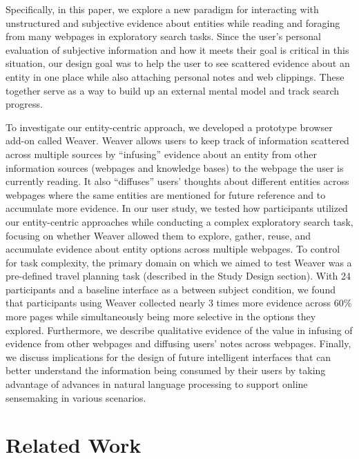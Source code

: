 Specifically, in this paper, we explore a new paradigm for interacting with unstructured and subjective evidence about entities while reading and foraging from many webpages in exploratory search tasks. Since the user's personal evaluation of subjective information and how it meets their goal is critical in this situation, our design goal was to help the user to see scattered evidence about an entity in one place while also attaching personal notes and web clippings. These together serve as a way to build up an external mental model and track search progress.

To investigate our entity-centric approach, we developed a prototype browser add-on called Weaver. Weaver allows users to keep track of information scattered across multiple sources by ``infusing'' evidence about an entity from other information sources (webpages and knowledge bases) to the webpage the user is currently reading. It also ``diffuses'' users' thoughts about different entities across webpages where the same entities are mentioned for future reference and to accumulate more evidence. In our user study, we tested how participants utilized our entity-centric approaches while conducting a complex exploratory search task, focusing on whether Weaver allowed them to explore, gather, reuse, and accumulate evidence about entity options across multiple webpages. To control for task complexity, the primary domain on which we aimed to test Weaver was a pre-defined travel planning task (described in the Study Design section). With 24 participants and a baseline interface as a between subject condition, we found that participants using Weaver collected nearly 3 times more evidence across 60\% more pages while simultaneously being more selective in the options they explored. Furthermore, we describe qualitative evidence of the value in infusing of evidence from other webpages and diffusing users' notes across webpages. Finally, we discuss implications for the design of future intelligent interfaces that can better understand the information being consumed by their users by taking advantage of advances in natural language processing to support online sensemaking in various scenarios.




\section{Related Work}



